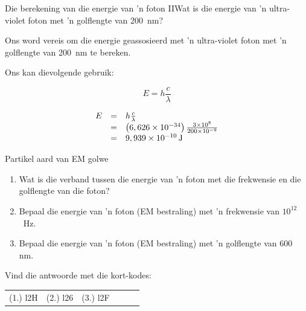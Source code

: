   \begin{wex}{Die berekening van die energie van 'n foton II}{Wat is die energie van 'n ultra-violet foton met 'n golflengte van 200~nm?}{
      \label{m38778*id189184}Ons word vereis om die energie geassosieerd met 'n ultra-violet foton met 'n golflengte van 200~nm te bereken.\par 
      \label{m38778*id189190}Ons kan dievolgende gebruik:\par 
      \label{m38778*id189193}\nopagebreak\noindent{}
        
    \begin{equation}
    E=h\frac{c}{\lambda }
      \end{equation}
      \label{m38778*id189220}\nopagebreak\noindent{}
    
    \begin{equation}
    \begin{array}{ccc}\hfill E& =& h\frac{c}{\lambda }\hfill \\ & =& \left(6,626\ensuremath{\times}{10}^{-34}\right)\frac{3\ensuremath{\times}{10}^{8}}{200\ensuremath{\times}{10}^{-9}}\hfill \\ & =& 9,939\ensuremath{\times}{10}^{-10}\phantom{\rule{0.166667em}{0ex}}\text{J}\hfill \end{array}
      \end{equation}}
         \end{wex}
      \label{m38778*uid13}
            \begin{exercises}{Partikel aard van EM golwe}
            \nopagebreak
        \label{m38778*id189384}\begin{enumerate}[noitemsep, label=\textbf{\arabic*}. ]
            \label{m38778*uid14}\item Wat is die verband tussen die energie van 'n foton met die frekwensie en die golflengte van die foton? \newline
\label{m38778*uid15}\item Bepaal die energie van 'n foton (EM bestraling) met 'n frekwensie van ${10}^{12}$~Hz.\newline
\label{m38778*uid16}\item Bepaal die energie van 'n foton (EM bestraling) met 'n golflengte van 600 nm.\newline
\end{enumerate}
  \label{m38778**end}
\par {} Vind die antwoorde met die kort-kodes:
 \par \begin{tabular}[h]{cccccc}
 (1.) l2H  &  (2.) l26  &  (3.) l2F  & \end{tabular}
\end{exercises}
            
